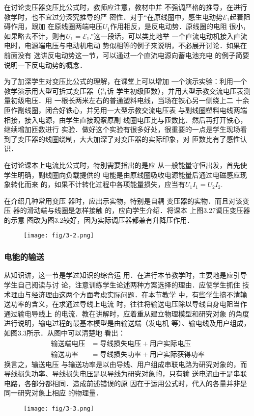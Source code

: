 在讨论变压器变压比公式时，教师应注意，教材中并
不强调严格的推导，在进行教学时，也不宜过分深究推导的严
密性．对于“在原线圈中，感生电动势$\mathcal{E}_1$起着阻碍作用，跟加
在原线圈两端电压$U_1$作用相反，是反电动势．原线圈的电阻
很小，如果略去不计，则有$U_1=\mathcal{E}_1$.”这一段话，可以类比地举
一个直流电动机接入直流电时，电源端电压与电动机电动
势似相等的例子来说明，不必展开讨论．如果在前面没有
选讲反电动势这一节，可以通过一个直流电源向蓄电池充电
的例子简要说明一下反电动势的概念．

为了加深学生对变压比公式的理解，在课堂上可以增加
一个演示实验：利用一个教学演示用大型可拆式变压器（告诉
学生初级匝数），并用大型示教交流电压表测量初级电压．用
一根长两米左右的普通塑料电线，当场在铁心另一侧绕上二
十余匝作副线圈，闭合好铁心，并另用一大型示教交流电压表
与副线圈塑料电线两端相接，接入电源，由学生直接观察原副
线圈电压比与匝数比．然后再打开铁心，继续增加匝数进行
实验．做好这个实验有很多好处，很重要的一点是学生现场看
到了变压器的线圈绕制，大大加深了对变压器的实际印象，对
匝数比有了感性认识．

在讨论课本上电流比公式时，特别需要指出的是应
从一般能量守恒出发，首先使学生明确，副线圈向负载提供的
电能是由原线圈吸收电源能量后通过电磁感应现象转化而来
的，如果不计转化过程中各项能量损失，应当有$U_1I_1=U_2I_2$.

在介绍几种常用变压
器时，应出示实物，特别是自耦
变压器的实物．而且对该变压
器的滑动端与线圈是怎样接触
的，应向学生介绍．将课本
上图3.27调压变压器的示意
图改为图3.2较好，因为实际调压器都兼有升降压作用．
\begin{figure}[htp]
    \centering
\texttt{[image: fig/3-2.png]}
    \caption{}
\end{figure}

\subsubsection{电能的输送}

从知识讲，这一节是学过知识的综合运
用．在进行本节教学时，主要地是应引导学生自己阅读与讨
论，注意训练学生论述两种方案选择的理由．应使学生抓住
技术理由与经济理由这两个方面考虑实际问题．在本节教学
中，有些学生搞不清输送功率的含义，在求通过导线上电流
时，往往将输送电压除以导线自身电阻当作通过输电导线上
的电流．教在讲解时，应着重从建立物理模型和研究对象
的角度进行说明，输电过程的最基本模型是由输送端（发电机
等）、输电线及用户组成，如图3.3所示．从图中可以清楚地
看出：
\[\begin{split}
   \text{输送端电压}&=\text{导线损失电压}+\text{用户实际电压}\\
   \text{输送功率}&=\text{导线损失功率}+\text{用户实际获得功率} 
\end{split}\]
换言之，输送电压
与输送功率是以由导线、用户组成串联电路为研究对象的，而
导线损失功率、导线损失电压是以导线为研究对象的，只有输
送电流由于是串联电路，各部分都相同．造成前述错误的原
因在于运用公式时，代入的各量并非是同一研究对象上相应
的物理量．
\begin{figure}[htp]
    \centering
\texttt{[image: fig/3-3.png]}
    \caption{}
\end{figure}


